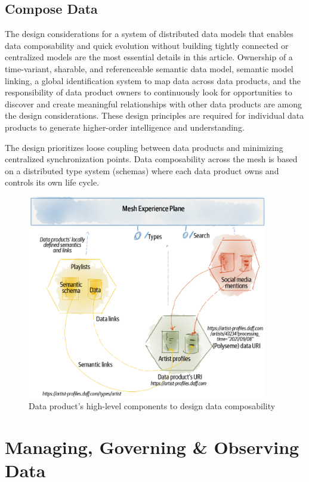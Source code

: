 \documentclass[12pt, a4paper]{book}
\begin{document}
\subsection{Compose Data}
The design considerations for a system of distributed data models that enables data composability and quick evolution without building tightly connected or centralized models are the most essential details in this article. Ownership of a time-variant, sharable, and referenceable semantic data model, semantic model linking, a global identification system to map data across data products, and the responsibility of data product owners to continuously look for opportunities to discover and create meaningful relationships with other data products are among the design considerations. These design principles are required for individual data products to generate higher-order intelligence and understanding.

The design prioritizes loose coupling between data products and minimizing centralized synchronization points. Data composability across the mesh is based on a distributed type system (schemas) where each data product owns and controls its own life cycle.

\begin{figure}
	\begin{framed}
		\centering
		\includegraphics[width=10.5cm]{ComposeData.png}
		\caption{Data product’s high-level components to design data composability}
		\label{ComposeData}
	\end{framed}
\end{figure}

\section{Managing, Governing \& Observing Data}
\end{document}
